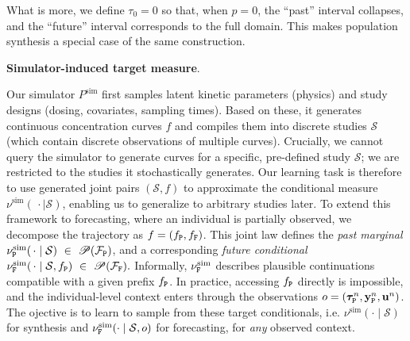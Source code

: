 What is more, we define $\tau_0 = 0$ so that, when $p=0$, the ``past'' interval collapses, and the ``future'' interval corresponds to the full domain. 
%
This makes population synthesis a special case of the same construction.

\textbf{Simulator-induced target measure}.

Our simulator $P^{\mathrm{sim}}$ first samples latent kinetic parameters (physics) and study designs (dosing, covariates, sampling times).
%
Based on these, it generates continuous concentration curves $f$ and compiles them into discrete studies $\mathcal{S}$ (which contain discrete observations of multiple curves).
%
Crucially, we cannot query the simulator to generate curves for a specific, pre-defined study $\mathcal{S}$; we are restricted to the studies it stochastically generates.
%
Our learning task is therefore to use generated joint pairs $(\mathcal{S}, f)$ to approximate the conditional measure $\nu^{\mathrm{sim}}(\,\cdot\mid \mathcal S)$, enabling us to generalize to arbitrary studies later.
To extend this framework to forecasting, where an individual is partially observed, we decompose the trajectory as $f=(f_{\tt P},f_{\tt F})$. This joint law defines the \textit{past marginal}
$\nu^{\mathrm{sim}}_{\tt P}(\,\cdot\mid\mathcal S)\ \in\ \mathscr{P}(\mathcal{F}_{\tt P})$,
%
and a corresponding \textit{future conditional}  $\nu^{\mathrm{sim}}_{\tt F}(\,\cdot\mid\mathcal{S},f_{\tt P})\ \in\ \mathscr{P}(\mathcal{F}_{\tt F}).$ Informally, $\nu^{\mathrm{sim}}_{\tt F}$ describes plausible continuations compatible with a given prefix $f_{\tt P}$.
%
In practice, accessing $f_{\tt P}$ directly is impossible, and the individual-level context enters through the observations $o = (\boldsymbol{\tau}^n_{\tt P},\mathbf y^n_{\tt P}, \mathbf{u}^n)$.
%
The ojective is to learn to sample from these target conditionals, i.e. $\nu^{\mathrm{sim}}(\cdot \mid \mathcal{S})$ for synthesis and $\nu^{\mathrm{sim}}_{\tt F}(\cdot \mid \mathcal{S}, o)$ for forecasting, for \textit{any} observed context.

%

